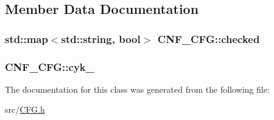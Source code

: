\subsection{Member Data Documentation}
\hypertarget{classCNF__CFG_ac3b39a62d63d5b0fbedf59456355a1f8}{
\subsubsection[{checked}]{\setlength{\rightskip}{0pt plus 5cm}std\-::map$<$std\-::string, bool$>$ C\-N\-F\-\_\-\-C\-F\-G\-::checked\hspace{0.3cm}{\ttfamily [protected]}}}\label{classCNF__CFG_ac3b39a62d63d5b0fbedf59456355a1f8}
\hypertarget{classCNF__CFG_ad8359be441579098a2df2fd979e2f816}{
\subsubsection[{cyk\-\_\-}]{ C\-N\-F\-\_\-\-C\-F\-G\-::cyk\-\_\-\hspace{0.3cm}{\ttfamily [protected]}}}\label{classCNF__CFG_ad8359be441579098a2df2fd979e2f816}


The documentation for this class was generated from the following file\-:\begin{DoxyCompactItemize}
\item 
src/\hyperlink{CFG_8h}{C\-F\-G.\-h}\end{DoxyCompactItemize}
